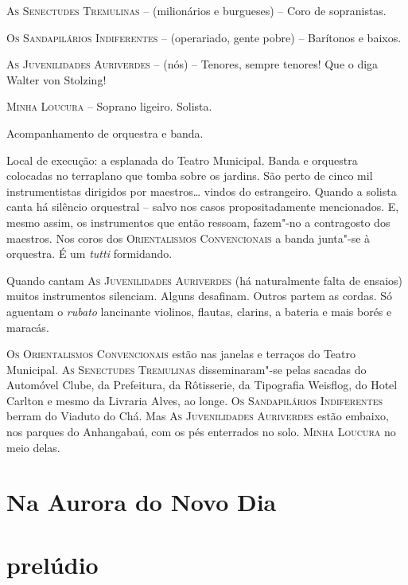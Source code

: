 \textsc{As Senectudes Tremulinas} -- (milionários e burgueses) -- Coro
de sopranistas.

\textsc{Os Sandapilários Indiferentes} -- (operariado, gente pobre) --
Barítonos e baixos.

\textsc{As Juvenilidades Auriverdes} -- (nós) -- Tenores, sempre
tenores! Que o diga Walter von Stolzing!

\textsc{Minha Loucura} -- Soprano ligeiro. Solista.

Acompanhamento de orquestra e banda.
\endgroup

\medskip

\begin{hangparas}{.15in}{1}
Local de execução: a esplanada do Teatro Municipal. Banda e orquestra
colocadas no terraplano que tomba sobre os jardins. São perto de cinco
mil instrumentistas dirigidos por maestros\ldots{} vindos do estrangeiro.
Quando a solista canta há silêncio orquestral -- salvo nos casos
propositadamente mencionados. E, mesmo assim, os instrumentos que então
ressoam, fazem"-no a contragosto dos maestros. Nos coros dos
\textsc{Orientalismos Convencionais} a banda junta"-se à orquestra. É um
\emph{tutti} formidando.

Quando cantam \textsc{As Juvenilidades Auriverdes} (há
naturalmente falta de ensaios) muitos instrumentos silenciam. Alguns
desafinam. Outros partem as cordas. Só aguentam o \emph{rubato}
lancinante violinos, flautas, clarins, a bateria e mais borés e maracás.

\textsc{Os Orientalismos Convencionais} estão nas janelas e terraços do
Teatro Municipal. \textsc{As Senectudes Tremulinas} disseminaram"-se
pelas sacadas do Automóvel Clube, da Prefeitura, da Rôtisserie, da
Tipografia Weisflog, do Hotel Carlton e mesmo da Livraria Alves, ao
longe. \textsc{Os Sandapilários Indiferentes} berram do Viaduto do Chá.
Mas \textsc{As Juvenilidades Auriverdes} estão embaixo, nos parques do
Anhangabaú, com os pés enterrados no solo. \textsc{Minha Loucura} no
meio delas.
\end{hangparas}

\medskip
\section*{Na Aurora do Novo Dia}

\section*{prelúdio}

